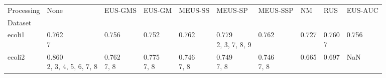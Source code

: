 \begin{tabular}{llllllllll}
\toprule
Processing &                                                     None &                                   EUS-GMS &                                 EUS-GM &                                MEUS-SS &                                         MEUS-SP &                                  MEUS-SSP &                                  NM &                                                RUS &                                   EUS-AUC \\
Dataset                &                                                          &                                           &                                        &                                        &                                                 &                                           &                                     &                                                    &                                           \\
\midrule
ecoli1                 &                       \makecell{0.762 \\ \scriptsize{7}} &         \makecell{0.756 \\ \scriptsize{}} &      \makecell{0.752 \\ \scriptsize{}} &      \makecell{0.762 \\ \scriptsize{}} &  \makecell{0.779 \\ \scriptsize{2, 3, 7, 8, 9}} &         \makecell{0.762 \\ \scriptsize{}} &   \makecell{0.727 \\ \scriptsize{}} &                 \makecell{0.760 \\ \scriptsize{7}} &         \makecell{0.756 \\ \scriptsize{}} \\
ecoli2                 &     \makecell{0.860 \\ \scriptsize{2, 3, 4, 5, 6, 7, 8}} &     \makecell{0.762 \\ \scriptsize{7, 8}} &  \makecell{0.775 \\ \scriptsize{7, 8}} &  \makecell{0.746 \\ \scriptsize{7, 8}} &           \makecell{0.749 \\ \scriptsize{7, 8}} &     \makecell{0.746 \\ \scriptsize{7, 8}} &   \makecell{0.665 \\ \scriptsize{}} &                  \makecell{0.697 \\ \scriptsize{}} &                                       NaN \\

\end{tabular}
